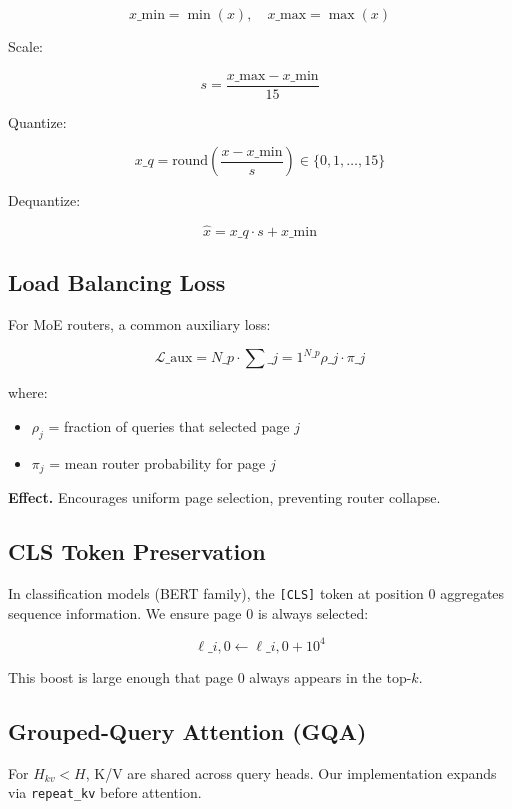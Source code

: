 \[
x\_\text{min} = \min(x), \quad x\_\text{max} = \max(x)
\tag{3.12}
\]

Scale:

\[
s = \frac{x\_\text{max} - x\_\text{min}}{15}
\tag{3.13}
\]

Quantize:

\[
x\_q = \text{round}\!\left(\frac{x - x\_\text{min}}{s}\right) \in \{0, 1, \dots, 15\}
\tag{3.14}
\]

Dequantize:

\[
\hat{x} = x\_q \cdot s + x\_\text{min}
\tag{3.15}
\]

\subsection{Load Balancing Loss}

For MoE routers, a common auxiliary loss:

\[
\mathcal{L}\_\text{aux} = N\_p \cdot \sum\_{j=1}^{N\_p} \rho\_j \cdot \pi\_j
\tag{3.16}
\]

where:

\begin{itemize}
\item $\rho_j$ = fraction of queries that selected page $j$
\item $\pi_j$ = mean router probability for page $j$

\end{itemize}
\textbf{Effect.} Encourages uniform page selection, preventing router collapse.

\subsection{CLS Token Preservation}

In classification models (BERT family), the \texttt{[CLS]} token at position 0 
aggregates sequence information. We ensure page 0 is always selected:

\[
\ell\_{i, 0} \leftarrow \ell\_{i, 0} + 10^4
\tag{3.17}
\]

This boost is large enough that page 0 always appears in the top-$k$.

\subsection{Grouped-Query Attention (GQA)}

For $H_{kv} < H$, K/V are shared across query heads. Our implementation 
expands via \texttt{repeat\_kv} before attention.


